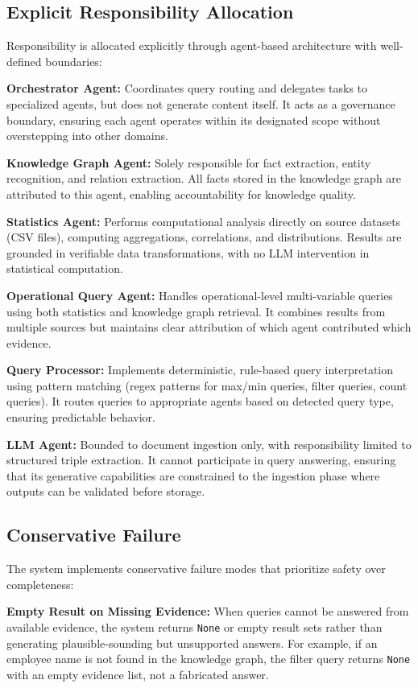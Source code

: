 \subsection{Explicit Responsibility Allocation}

Responsibility is allocated explicitly through agent-based architecture with well-defined boundaries:

\textbf{Orchestrator Agent:} Coordinates query routing and delegates tasks to specialized agents, but does not generate content itself. It acts as a governance boundary, ensuring each agent operates within its designated scope without overstepping into other domains.

\textbf{Knowledge Graph Agent:} Solely responsible for fact extraction, entity recognition, and relation extraction. All facts stored in the knowledge graph are attributed to this agent, enabling accountability for knowledge quality.

\textbf{Statistics Agent:} Performs computational analysis directly on source datasets (CSV files), computing aggregations, correlations, and distributions. Results are grounded in verifiable data transformations, with no LLM intervention in statistical computation.

\textbf{Operational Query Agent:} Handles operational-level multi-variable queries using both statistics and knowledge graph retrieval. It combines results from multiple sources but maintains clear attribution of which agent contributed which evidence.

\textbf{Query Processor:} Implements deterministic, rule-based query interpretation using pattern matching (regex patterns for max/min queries, filter queries, count queries). It routes queries to appropriate agents based on detected query type, ensuring predictable behavior.

\textbf{LLM Agent:} Bounded to document ingestion only, with responsibility limited to structured triple extraction. It cannot participate in query answering, ensuring that its generative capabilities are constrained to the ingestion phase where outputs can be validated before storage.

\subsection{Conservative Failure}

The system implements conservative failure modes that prioritize safety over completeness:

\textbf{Empty Result on Missing Evidence:} When queries cannot be answered from available evidence, the system returns \texttt{None} or empty result sets rather than generating plausible-sounding but unsupported answers. For example, if an employee name is not found in the knowledge graph, the filter query returns \texttt{None} with an empty evidence list, not a fabricated answer.

